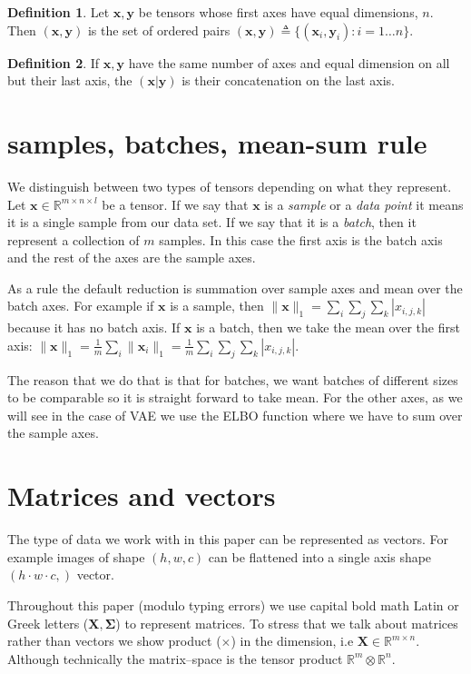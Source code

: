 \documentclass[11pt, a4paper]{report}
\theoremstyle{plain}
\theoremstyle{definition}
\newtheorem{mydef}{Definition}[chapter]
\theoremstyle{remark}
\newcommand{\R}{\mathbb{R}}
\newcommand{\x}{\mathbf{x}}
\newcommand{\y}{\mathbf{y}}
\newcommand{\bv}[1]{\boldsymbol{#1}}
\begin{document}
\begin{mydef}
\label{def:pairnotaion}
Let $\x, \y$ be tensors whose first axes have equal dimensions, $n$. Then $(\x, \y)$
is the set of ordered pairs $(\x,\y) \triangleq \{(\x_i,\y_i) : i=1 \dots n\}$.
\end{mydef}

\begin{mydef}
\label{def:concat}
If $\x,\y$ have the same number of axes and equal dimension on all but their last axis, 
the $(\x|\y)$ is their concatenation on the last axis. 
\end{mydef}

\section{samples, batches, mean-sum rule}

We distinguish between two types of tensors depending on what they represent.
Let $\x \in \R^{m \times n \times l}$ be a tensor. If we say that $\x$ is a
\emph{sample} or a \emph{data point} it means it is a single sample from our
data set. If we say that it is a \emph{batch}, then it represent a collection of
$m$ samples. In this case the first axis is the batch axis and the rest of the
axes are the sample axes.

As a rule the default reduction is summation over sample axes and mean over the
batch axes. For example if $\x$ is a sample, then $\|\x \|_1 = \sum_i \sum_j
\sum_k |x_{i,j,k}|$ because it has no batch axis. If $\x$ is a batch, then we
take the mean over the first axis: $\| \x \|_1 = \frac{1}{m} \sum_i \| \x_i \|_1
= \frac{1}{m} \sum_i \sum_j \sum_k |x_{i,j,k}|$.

The reason that we do that is that for batches, we want batches of different
sizes to be comparable so it is straight forward to take mean. For the other
axes, as we will see in the case of VAE we use the ELBO function where we have
to sum over the sample axes.

\label{meansumrule}


\section{Matrices and vectors}

The type of data we work with in this paper can be represented as vectors. For
example images of shape $(h,w,c)$ can be flattened into a single axis shape $(h
\cdot w \cdot c,)$ vector.

Throughout this paper (modulo typing errors) we use capital bold math Latin or
Greek letters ($\bv{X, \Sigma}$) to represent matrices. To stress that we talk
about matrices rather than vectors we show product ($\times$) in the dimension,
i.e $\bv{X} \in \R^{m \times n}$. Although technically the matrix--space is the
tensor product $\R^m \otimes \R^n$.
\end{document}
